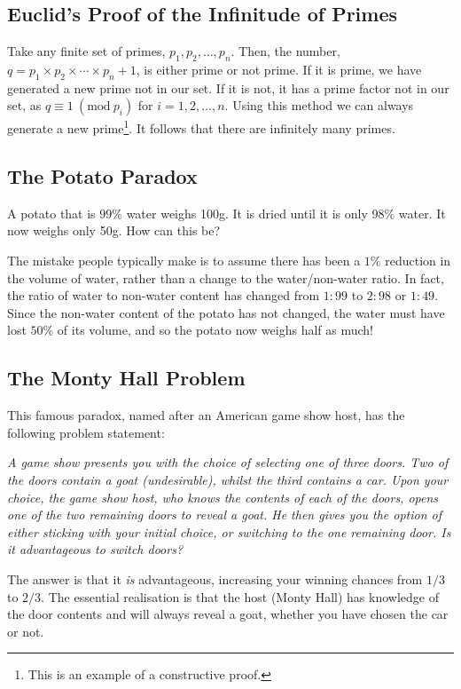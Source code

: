 \documentclass[11pt]{amsart}
\begin{document}
\subsection{Euclid's Proof of the Infinitude of Primes}

Take any finite set of primes, $p_1, p_2, \dots, p_n$. Then, the number, $q = p_1 \times p_2 \times \cdots \times p_n + 1$, is either prime or not prime. If it is prime, we have generated a new prime not in our set. If it is not, it has a prime factor not in our set, as $q \equiv 1 \ (\text{mod}\ p_i)$ for $i = 1, 2, \dots, n$. Using this method we can always generate a new prime\footnote{This is an example of a constructive proof.}.  It follows that there are infinitely many primes.

\subsection{The Potato Paradox}

A potato that is $99\%$ water weighs 100g. It is dried until it is only $98\%$ water. It now weighs only 50g. How can this be?

The mistake people typically make is to assume there has been a $1\%$ reduction in the volume of water, rather than a change to the water/non-water ratio. In fact, the ratio of water to non-water content has changed from $1:99$ to $2:98$ or $1:49$. Since the non-water content of the potato has not changed, the water must have lost $50\%$ of its volume, and so the potato now weighs half as much!

\subsection{The Monty Hall Problem}

This famous paradox, named after an American game show host, has the following problem statement:

\emph{A game show presents you with the choice of selecting one of three doors. Two of the doors contain a goat (undesirable), whilst the third contains a car. Upon your choice, the game show host, who knows the contents of each of the doors, opens one of the two remaining doors to reveal a goat. He then gives you the option of either sticking with your initial choice, or switching to the one remaining door. Is it advantageous to switch doors?}

The answer is that it \emph{is} advantageous, increasing your winning chances from $1/3$ to $2/3$. The essential realisation is that the host (Monty Hall) has knowledge of the door contents and will always reveal a goat, whether you have chosen the car or not.
\end{document}
